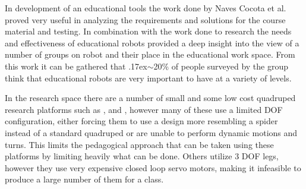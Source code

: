 \documentclass[12pt]{report}
\newcommand{\approximately}{{\raise.17ex\hbox{$\scriptstyle\mathtt{\sim}$}}}
\begin{document}
In development of an educational tools the work done by Naves Cocota et al.\cite{6900173} proved very useful in analyzing the requirements and solutions for the course material and testing. In combination with the work done to research the needs and effectiveness of educational robots \cite{8001854} provided a deep insight into the view of a number of groups on robot and their place in the educational work space. From this work it can be gathered that \approximately20\% of people surveyed by the group think that educational robots are very important to have at a variety of levels.

In the research space there are a number of small and some low cost quadruped research platforms such as \cite{Aracna}, \cite{shkolnik2010motion} and \cite{77248}, however many of these use a limited DOF configuration, either forcing them to use a design more resembling a spider \cite{Aracna} instead of a standard quadruped or are unable to perform dynamic motions and turns. This limits the pedagogical approach that can be taken using these platforms by limiting heavily what can be done. Others utilize 3 DOF legs, however they use very expensive closed loop servo motors, making it infeasible to produce a large number of them for a class.
\end{document}
